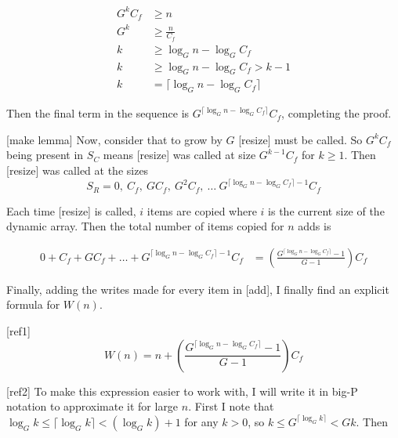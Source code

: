\documentclass{article}
\newcommand{\nwritesfn}{W}
\newcommand{\varnitems}{n}
\newcommand{\initcapacity}{C_f}
\newcommand{\growthfactor}{G}
\begin{document}
	\begin{align*}
	\growthfactor^k\initcapacity &\geq \varnitems\\
	\growthfactor^k &\geq \frac{\varnitems}{\initcapacity}\\
	k &\geq \log_{\growthfactor} \varnitems - \log_{\growthfactor} \initcapacity\\
	k &\geq \log_{\growthfactor} \varnitems - \log_{\growthfactor} \initcapacity > k - 1\\
	k &= \big\lceil \log_{\growthfactor} \varnitems - \log_{\growthfactor} \initcapacity \big\rceil
	\end{align*}
	
	Then the final term in the sequence is $\growthfactor^{\lceil \log_{\growthfactor} \varnitems - \log_{\growthfactor} \initcapacity \rceil}\initcapacity$, completing the proof.
	
	[make lemma]
	Now, consider that to grow by $\growthfactor$ [resize] must be called. So $\growthfactor^k\initcapacity$ being present in $S_C$ means [resize] was called at size $\growthfactor^{k - 1}\initcapacity$ for $k \geq 1$. Then [resize] was called at the sizes $$S_R = 0,\ \initcapacity,\ \growthfactor\initcapacity,\ \growthfactor^2\initcapacity,\ \ldots\ \growthfactor^{\lceil \log_{\growthfactor} \varnitems - \log_{\growthfactor} \initcapacity \rceil - 1}\initcapacity$$
	
	Each time [resize] is called, $i$ items are copied where $i$ is the current size of the dynamic array. Then the total number of items copied for $\varnitems$ adds is
	
	\begin{align*}
	0 + \initcapacity + \growthfactor\initcapacity + \ldots + \growthfactor^{\lceil \log_{\growthfactor} \varnitems - \log_{\growthfactor} \initcapacity \rceil - 1}\initcapacity &= \left( \frac{\growthfactor^{\lceil \log_{\growthfactor} \varnitems - \log_{\growthfactor} \initcapacity \rceil} - 1}{\growthfactor - 1} \right) \initcapacity
	\end{align*}
	
	Finally, adding the writes made for every item in [add], I finally find an explicit formula for $\nwritesfn(\varnitems)$.
	
	[ref1]
	$$
	\nwritesfn(\varnitems) = \varnitems + \left( \frac{\growthfactor^{\lceil \log_{\growthfactor} \varnitems - \log_{\growthfactor} \initcapacity \rceil} - 1}{\growthfactor - 1} \right) \initcapacity
	$$
	
	[ref2]
	To make this expression easier to work with, I will write it in big-P notation to approximate it for large $\varnitems$. First I note that $\log_{\growthfactor} k \leq \lceil \log_{\growthfactor} k \rceil < \left( \log_{\growthfactor} k \right) + 1$ for any $k > 0$, so $k \leq \growthfactor^{\lceil \log_{\growthfactor} k \rceil} < \growthfactor{k}$. Then
	
\end{document}

